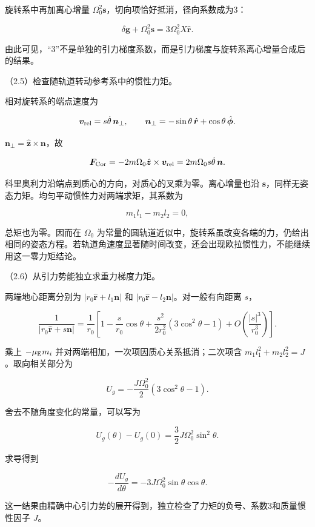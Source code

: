\documentclass[12pt,a4paper,fontset=fandol]{ctexart}
\begin{document}
旋转系中再加离心增量
\(\Omega_0^2\boldsymbol s\)，切向项恰好抵消，径向系数成为3：

\[
\delta\boldsymbol g+\Omega_0^2\boldsymbol s
=3\Omega_0^2X\hat{\boldsymbol r}.
\]

由此可见，``3''不是单独的引力梯度系数，而是引力梯度与旋转系离心增量合成后的结果。

（2.5）检查随轨道转动参考系中的惯性力矩。

相对旋转系的端点速度为

\[
\boldsymbol v_{\rm rel}=s\dot\theta\,\boldsymbol n_\perp,\qquad
\boldsymbol n_\perp=-\sin\theta\,\hat{\boldsymbol r}
+\cos\theta\,\hat{\boldsymbol\phi}.
\]

\(\boldsymbol n_\perp=\hat{\boldsymbol z}\times\boldsymbol n\)，故

\[
\boldsymbol F_{\rm Cor}
=-2m\Omega_0\hat{\boldsymbol z}\times\boldsymbol v_{\rm rel}
=2m\Omega_0s\dot\theta\,\boldsymbol n.
\]

科里奥利力沿端点到质心的方向，对质心的叉乘为零。离心增量也沿
\(\boldsymbol s\)，同样无姿态力矩。均匀平动惯性力对两端求矩，其系数为

\[
m_1l_1-m_2l_2=0,
\]

总矩也为零。因而在 \(\Omega_0\)
为常量的圆轨道近似中，旋转系虽改变各端的力，仍给出相同的姿态方程。若轨道角速度显著随时间改变，还会出现欧拉惯性力，不能继续用这一零力矩结论。

（2.6）从引力势能独立求重力梯度力矩。

两端地心距离分别为 \(|r_0\hat{\boldsymbol r}+l_1\boldsymbol n|\) 和
\(|r_0\hat{\boldsymbol r}-l_2\boldsymbol n|\)。对一般有向距离 \(s\)，

\[
\frac1{|r_0\hat{\boldsymbol r}+s\boldsymbol n|}
=\frac1{r_0}\left[
1-\frac{s}{r_0}\cos\theta
+\frac{s^2}{2r_0^2}(3\cos^2\theta-1)
+O\left(\frac{|s|^3}{r_0^3}\right)\right].
\]

乘上 \(-\mu_{\rm E}m_i\) 并对两端相加，一次项因质心关系抵消；二次项含
\(m_1l_1^2+m_2l_2^2=J\)。取向相关部分为

\[
U_g=-\frac{J\Omega_0^2}{2}(3\cos^2\theta-1).
\]

舍去不随角度变化的常量，可以写为

\[
U_g(\theta)-U_g(0)=\frac32J\Omega_0^2\sin^2\theta.
\]

求导得到

\[
-\frac{dU_g}{d\theta}
=-3J\Omega_0^2\sin\theta\cos\theta.
\]

这一结果由精确中心引力势的展开得到，独立检查了力矩的负号、系数3和质量惯性因子
\(J\)。
\end{document}
